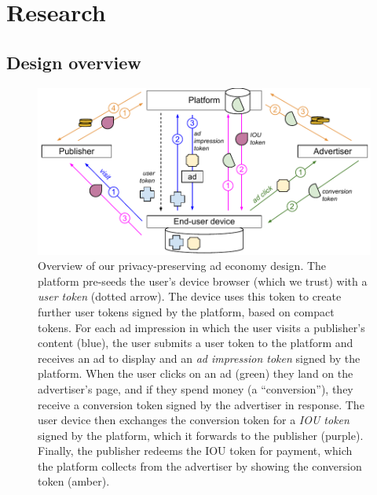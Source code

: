 \section{Research}
\label{r:stuff}

\subsection{Design overview}
\label{s:design}
%
%
%
%

\begin{figure}
 \centering
 \includegraphics{figures/overview.pdf}
 \caption{Overview of our privacy-preserving ad economy design. The platform pre-seeds the user's device browser (which we trust) with a \emph{user token} (dotted arrow).
	  The device uses this token to create further
	  user tokens signed by the platform, based on compact tokens. For each ad impression in which the user visits a publisher's content ({\color{blue}blue}), the
	  user submits a user token to the platform and receives an ad to display and an \emph{ad impression token} signed by the platform. When the user clicks on an ad
	  ({\color{OliveGreen}green}) they land on the advertiser's page, and if they spend money (a ``conversion''), they receive a conversion token signed by the advertiser in response. The
	  user device then exchanges the conversion token for a \emph{IOU token} signed by the platform, which it forwards to the publisher ({\color{Magenta}purple}). Finally, the publisher
	  redeems the IOU token for payment, which the platform collects from the advertiser by showing the conversion token ({\color{Dandelion}amber}).}
 \label{f:overview}
\end{figure}

